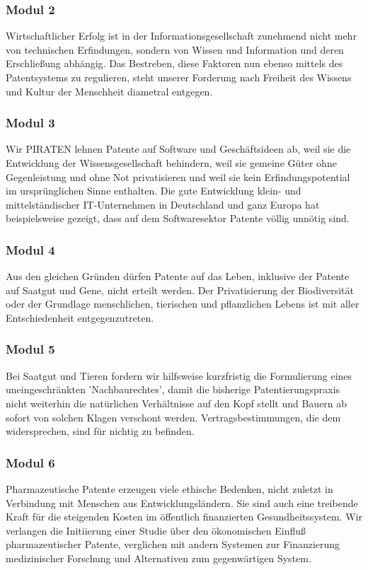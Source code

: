 \subsubsection{Modul 2}
\abstimmung
Wirtschaftlicher Erfolg ist in der Informationsgesellschaft zunehmend nicht mehr von technischen Erfindungen, sondern von Wissen und Information und deren Erschließung abhängig. Das Bestreben, diese Faktoren nun ebenso mittels des Patentsystems zu regulieren, steht unserer Forderung nach Freiheit des Wissens und Kultur der Menschheit diametral entgegen.

\subsubsection{Modul 3}
\abstimmung
Wir PIRATEN lehnen Patente auf Software und Geschäftsideen ab, weil sie die Entwicklung der Wissensgesellschaft behindern, weil sie gemeine Güter ohne Gegenleistung und ohne Not privatisieren und weil sie kein Erfindungspotential im ursprünglichen Sinne enthalten. Die gute Entwicklung klein- und mittelständischer IT-Unternehmen in Deutschland und ganz Europa hat beispielsweise gezeigt, dass auf dem Softwaresektor Patente völlig unnötig sind.

\subsubsection{Modul 4}
\abstimmung
Aus den gleichen Gründen dürfen Patente auf das Leben, inklusive der Patente auf Saatgut und Gene, nicht erteilt werden. Der Privatisierung der Biodiversität oder der Grundlage menschlichen, tierischen und pflanzlichen Lebens ist mit aller Entschiedenheit entgegenzutreten.

\subsubsection{Modul 5}
\abstimmung
Bei Saatgut und Tieren fordern wir hilfsweise kurzfristig die Formulierung eines uneingeschränkten 'Nachbaurechtes', damit die bisherige Patentierungspraxis nicht weiterhin die natürlichen Verhältnisse auf den Kopf stellt und Bauern ab sofort von solchen Klagen verschont werden. Vertragsbestimmungen, die dem widersprechen, sind für nichtig zu befinden.

\subsubsection{Modul 6}
\abstimmung
Pharmazeutische Patente erzeugen viele ethische Bedenken, nicht zuletzt in Verbindung mit Menschen aus Entwicklungsländern. Sie sind auch eine treibende Kraft für die steigenden Kosten im öffentlich finanzierten Gesundheitssystem. Wir verlangen die Initiierung einer Studie über den ökonomischen Einfluß pharmazeutischer Patente, verglichen mit andern Systemen zur Finanzierung medizinischer Forschung und Alternativen zum gegenwärtigen System.
 
